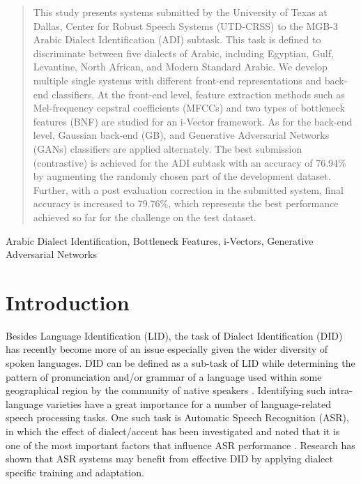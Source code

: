 \documentclass{article}
\begin{document}
\begin{abstract}
This study presents systems submitted by the University of Texas at Dallas, Center for Robust Speech Systems (UTD-CRSS) to the MGB-3 Arabic Dialect Identification (ADI) subtask. This task is defined to discriminate between five dialects of Arabic, including Egyptian, Gulf, Levantine, North African, and Modern Standard Arabic. We develop multiple single systems with different front-end representations and back-end classifiers. At the front-end level, feature extraction methods such as Mel-frequency cepstral coefficients (MFCCs) and two types of bottleneck features (BNF) are studied for an i-Vector framework. As for the back-end level, Gaussian back-end (GB), and Generative Adversarial Networks (GANs) classifiers are applied alternately. The best submission (contrastive) is achieved for the ADI subtask with an accuracy of 76.94\% by augmenting the randomly chosen part of the development dataset. Further, with a post evaluation correction in the submitted system, final accuracy is increased to 79.76\%, which represents the best performance achieved so far for the challenge on the test dataset. 


\end{abstract}
%
\begin{keywords}
Arabic Dialect Identification, Bottleneck Features, i-Vectors, Generative Adversarial Networks
\end{keywords}
%
\section{Introduction}
\label{sec:intro}

Besides Language Identification (LID), the task of Dialect Identification (DID) has recently become more of an issue especially given the wider diversity of spoken languages. DID can be defined as a sub-task of LID while determining the pattern of pronunciation and/or grammar of a language used within some geographical region by the community of native speakers \cite{lei2011adiGMM}. Identifying such intra-language varieties have a great importance for a number of language-related speech processing tasks. One such task is Automatic Speech Recognition (ASR), in which the effect of dialect/accent has been investigated and noted that it is one of the most important factors that influence ASR performance \cite{gupta1982effects, Huang20011377}. Research has shown that \cite{diakoloukas1997development, humphries1998use, liu2000mandarin, ward2002lexicon, soltau2011modern} ASR systems may benefit from effective DID by applying dialect specific training and adaptation.
\end{document}
